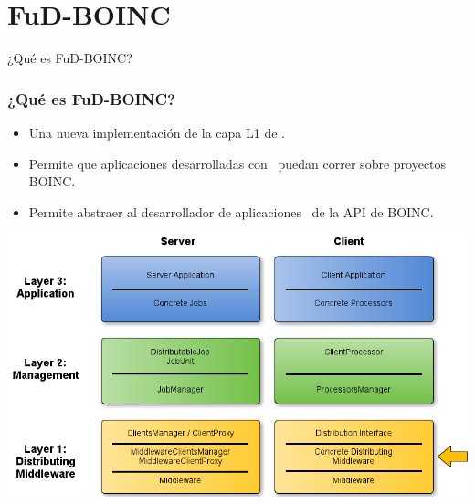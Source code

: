 \section{FuD-BOINC}

\begin{subsection}{¿Qué es FuD-BOINC?}

	\begin{frame}\frametitle{¿Qué es FuD-BOINC?}	
		\begin{itemize}
		\item Una nueva implementación de la capa L1 de \fud .
		\item Permite que aplicaciones desarrolladas con \fud \ puedan correr sobre proyectos BOINC.
		\item Permite abstraer al desarrollador de aplicaciones \fud \ de la API de BOINC.
		\end{itemize}
		
		\begin{center}
			\includegraphics[scale=0.27]{images/AbstractLayers-FuD-L1.png}
		\end{center}
	\end{frame}
	
\end{subsection}
				

